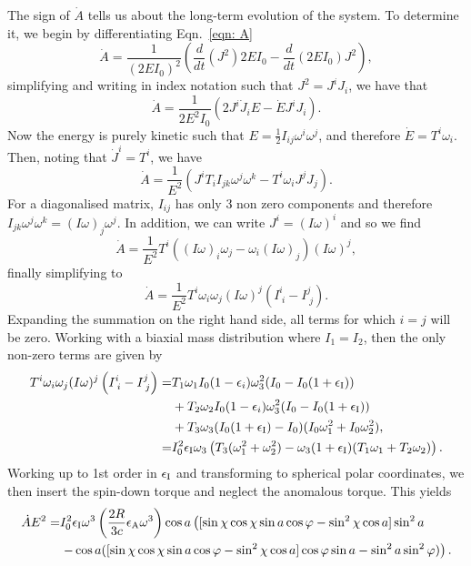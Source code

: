 \documentclass[../full_thesis/full_thesis.tex]{subfiles}
\begin{document}
The sign of $\dot{A}$ tells us about the long-term evolution of the system. To
determine it, we begin by differentiating Eqn.~\eqref{eqn: A}
\begin{equation}
\dot{A}=\frac{1}{(2EI_{0})^{2}}
        \left(\frac{d}{dt}(J^{2})2EI_{0}-\frac{d}{dt}(2EI_{0})J^{2}\right),
\end{equation}
simplifying and writing in index notation such that $J^{2}=J^iJ_i$, we have that
\begin{equation}
\dot{A}=\frac{1}{2E^{2}I_0}\left(2J^{i}\dot{J}_{i}E-\dot{E}J^{i}J_{i}\right).
\end{equation}
Now the energy is purely kinetic such that
$E=\frac{1}{2}I_{ij}\omega^{i}\omega^{j}$, and therefore $\dot{E}=T^{i}\omega_{i}$.
Then, noting that $\dot{J}^{i}=T^{i}$, we have
\begin{equation}
\dot{A}=\frac{1}{E^{2}}\left(J^{i}T_{i}I_{jk}\omega^{j}\omega^{k}
                             -T^{i}\omega_{i}J^{j}J_{j}\right).
\end{equation}
For a diagonalised matrix, $I_{ij}$ has only 3 non zero components and therefore
$I_{jk}\omega^{j}\omega^{k}=(I\omega)_{j}\omega^{j}$. In addition, we can write
$J^{i}=(I\omega)^{i}$ and so we find
\begin{equation}
\dot{A}=\frac{1}{E^{2}}T^{i}\left((I\omega)_{i}\omega_{j}
        -\omega_{i}(I\omega)_{j}\right)(I\omega)^{j},
\end{equation}
finally simplifying to
\begin{equation}
\dot{A}=\frac{1}{E^{2}}T^{i}\omega_{i}\omega_{j}
        (I\omega)^{j}\left(I^{i}_{\;i}-I^{j}_{\;j}\right).
\end{equation}
Expanding the
summation on the right hand side, all terms for which $i=j$ will be zero. Working with a biaxial mass
distribution where $I_{1}=I_{2}$, then the only non-zero terms are given by
\begin{align}
T^{i}\omega_{i}\omega_{j}(I\omega)^{j}\left(I^{i}_{\;i}-I^{j}_{\;j}\right) =&
T_{1}\omega_{1}I_{0}(1-\epsilon_{i})\omega^{2}_{3}
(I_{0}-I_{0}(1+\epsilon_{\mathrm{I}}))
\nonumber \\
 & + T_{2}\omega_{2}I_{0}(1-\epsilon_{i})\omega^{2}_{3}(I_{0}-I_{0}(1+\epsilon_{\mathrm{I}}))
\nonumber \\ 
& +
T_{3}\omega_{3}(I_{0}(1+\epsilon_{\mathrm{I}})-I_{0})
               (I_{0}\omega_{1}^{2}+I_{0}\omega_{2}^{2}), \\
=& I_{0}^{2}\epsilon_{\mathrm{I}}\omega_{3}\left(T_{3}(\omega_{1}^{2}+\omega_{2}^{2})
    - \omega_{3}(1+\epsilon_{\mathrm{I}})(T_{1}\omega_{1}+T_{2}\omega_{2})\right).
\end{align}
Working up to 1st order in $\epsilon_{\mathrm{I}}$ and transforming to spherical polar
coordinates, we then insert the spin-down torque and neglect the anomalous torque.
This yields
\begin{align}
\dot{A}E^{2} = & I_{0}^{2}\epsilon_{\mathrm{I}}\omega^{3}
    \left(\frac{2R}{3c}\epsilon_{\mathrm{A}}\omega^{3}\right)
    \cos a \left([\sin \chi \cos \chi \sin a \cos \varphi
                 - \sin^{2}\chi \cos a]\sin^{2} a \right. \nonumber \\
& \left.- \cos a ([\sin \chi \cos \chi \sin a \cos \varphi
                   - \sin^{2}\chi \cos a]\cos \varphi \sin a
                   - \sin^{2}a \sin^{2}\varphi)\right).
\end{align}
\end{document}
